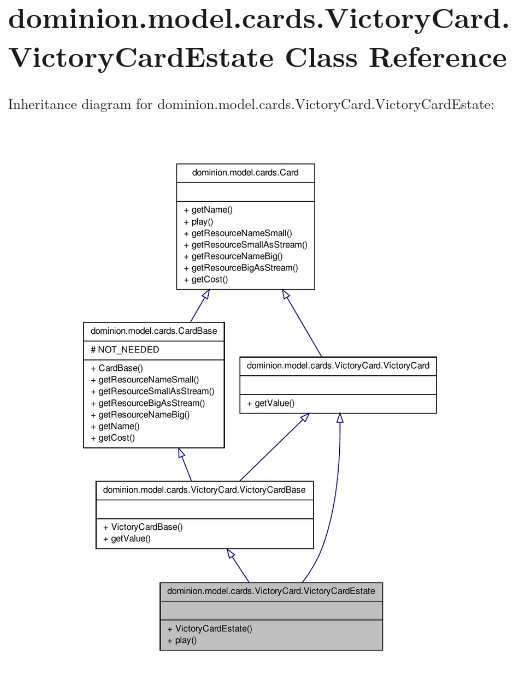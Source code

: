 \hypertarget{classdominion_1_1model_1_1cards_1_1VictoryCard_1_1VictoryCardEstate}{\section{dominion.\-model.\-cards.\-Victory\-Card.\-Victory\-Card\-Estate \-Class \-Reference}
\label{classdominion_1_1model_1_1cards_1_1VictoryCard_1_1VictoryCardEstate}
}


\-Inheritance diagram for dominion.\-model.\-cards.\-Victory\-Card.\-Victory\-Card\-Estate\-:
\nopagebreak
\begin{figure}[H]
\begin{center}
\leavevmode
\includegraphics[width=350pt]{classdominion_1_1model_1_1cards_1_1VictoryCard_1_1VictoryCardEstate__inherit__graph}
\end{center}
\end{figure}


